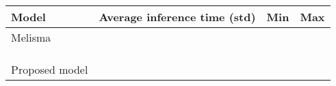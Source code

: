 \begin{tabular}{l|lll}
    Model & Average inference time (std) & Min & Max \\
    \hline
    Melisma & & & \\
    \textcite{chen2021attend} & & & \\
    \textcite{mcleod2021modular} & & & \\
    \textcite{micchi2020not} & & & \\
    Proposed model & & & \\
\end{tabular}
